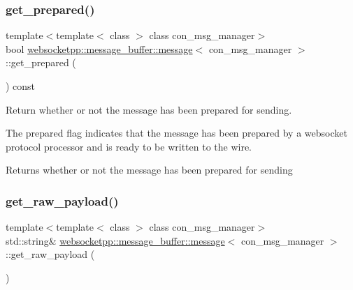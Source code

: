 \subsubsection{\texorpdfstring{get\+\_\+prepared()}{get\_prepared()}}
{\footnotesize\ttfamily template$<$template$<$ class $>$ class con\+\_\+msg\+\_\+manager$>$ \\
bool \mbox{\hyperlink{classwebsocketpp_1_1message__buffer_1_1message}{websocketpp\+::message\+\_\+buffer\+::message}}$<$ con\+\_\+msg\+\_\+manager $>$\+::get\+\_\+prepared (\begin{DoxyParamCaption}{ }\end{DoxyParamCaption}) const\hspace{0.3cm}{\ttfamily [inline]}}



Return whether or not the message has been prepared for sending. 

The prepared flag indicates that the message has been prepared by a websocket protocol processor and is ready to be written to the wire.

\begin{DoxyReturn}{Returns}
whether or not the message has been prepared for sending 
\end{DoxyReturn}
\mbox{\label{classwebsocketpp_1_1message__buffer_1_1message_a403b47e95d65df5b7514eb4eaa89a6df}} 
\subsubsection{\texorpdfstring{get\+\_\+raw\+\_\+payload()}{get\_raw\_payload()}}
{\footnotesize\ttfamily template$<$template$<$ class $>$ class con\+\_\+msg\+\_\+manager$>$ \\
std\+::string\& \mbox{\hyperlink{classwebsocketpp_1_1message__buffer_1_1message}{websocketpp\+::message\+\_\+buffer\+::message}}$<$ con\+\_\+msg\+\_\+manager $>$\+::get\+\_\+raw\+\_\+payload (\begin{DoxyParamCaption}{ }\end{DoxyParamCaption})\hspace{0.3cm}{\ttfamily [inline]}}




